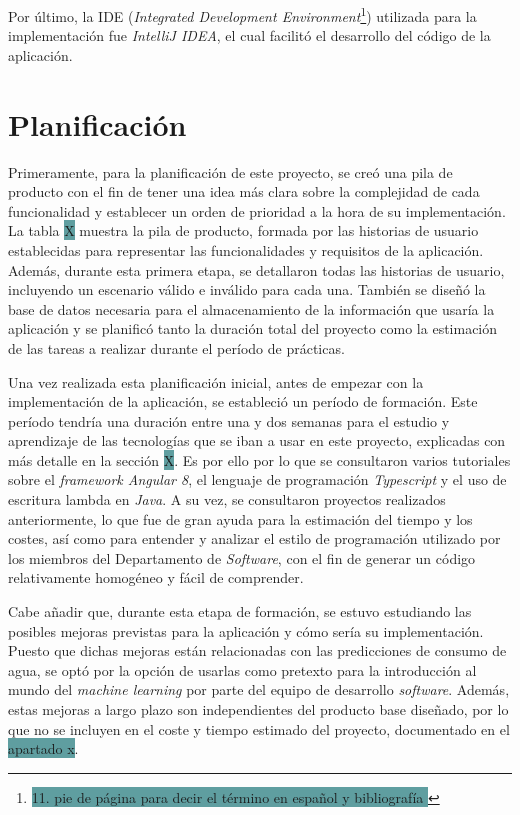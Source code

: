 \documentclass[pdftex,11pt,a4paper]{book}
\begin{document}
Por último, la IDE (\textit{Integrated Development Environment}\footnote{\colorbox{CadetBlue}{11. pie de página para decir el término en español y bibliografía \cite{bib:ide}} }) utilizada para la implementación fue \textit{IntelliJ IDEA}, el cual facilitó el desarrollo del código de la aplicación. 

\section{Planificación}

Primeramente, para la planificación de este proyecto, se creó una pila de producto con el fin de tener una idea más clara sobre la complejidad de cada funcionalidad y establecer un orden de prioridad a la hora de su implementación. La tabla \colorbox{CadetBlue}{ X} muestra la pila de producto, formada por las historias de usuario establecidas para representar las funcionalidades y requisitos de la aplicación. Además, durante esta primera etapa, se detallaron todas las historias de usuario, incluyendo un escenario válido e inválido para cada una. También se diseñó la base de datos necesaria para el almacenamiento de la información que usaría la aplicación y se planificó tanto la duración total del proyecto como la estimación de las tareas a realizar durante el período de prácticas.

Una vez realizada esta planificación inicial, antes de empezar con la implementación de la aplicación, se estableció un período de formación. Este período tendría una duración entre una y dos semanas para el estudio y aprendizaje de las tecnologías que se iban a usar en este proyecto, explicadas con más detalle en la sección \colorbox{CadetBlue}{X}. Es por ello por lo que se consultaron varios tutoriales sobre el \textit{framework Angular 8}, el lenguaje de programación \textit{Typescript} y el uso de escritura lambda en \textit{Java}. A su vez, se consultaron proyectos realizados anteriormente, lo que fue de gran ayuda para la estimación del tiempo y los costes, así como para entender y analizar el estilo de programación utilizado por los miembros del Departamento de \textit{Software}, con el fin de generar un código relativamente homogéneo y fácil de comprender. 

Cabe añadir que, durante esta etapa de formación, se estuvo estudiando las posibles mejoras previstas para la aplicación y cómo sería su implementación. Puesto que dichas mejoras están relacionadas con las predicciones de consumo de agua, se optó por la opción de usarlas como pretexto para la introducción al mundo del \textit{machine learning} por parte del equipo de desarrollo \textit{software}. Además, estas mejoras a largo plazo son independientes del producto base diseñado, por lo que no se incluyen en el coste y tiempo estimado del proyecto, documentado en el \colorbox{CadetBlue}{apartado x}.
\end{document}
